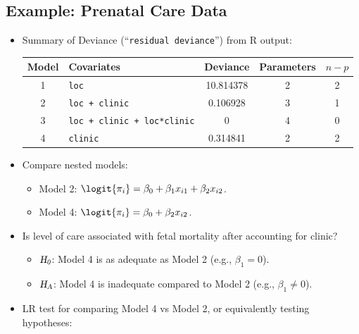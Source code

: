 \documentclass[oneside]{book}\usepackage[]{graphicx}\usepackage[svgnames]{xcolor}
\newcommand{\HN}{\textsl{H}_{\textsl{0}}}%
\newcommand{\HA}{\textsl{H}_{\textsl{A}}}%
\begin{document}
\subsection*{Example: Prenatal Care Data}
\begin{itemize}
      \item Summary of Deviance (``\texttt{residual deviance}'') from R output:
            \begin{table}[!htbp]
                  \centering
                  \begin{tabular}{clccc}
                        \toprule
                        Model & Covariates                         & Deviance  & Parameters & $ n-p $ \\
                        \midrule
                        1     & \texttt{loc}                       & 10.814378 & 2          & 2       \\
                        2     & \texttt{loc + clinic}              & 0.106928  & 3          & 1       \\
                        3     & \texttt{loc + clinic + loc*clinic} & 0         & 4          & 0       \\
                        4     & \texttt{clinic}                    & 0.314841  & 2          & 2       \\
                        \bottomrule
                  \end{tabular}
            \end{table}
      \item Compare nested models:
            \begin{itemize}
                  \item Model 2: $ \logit{\pi_i}=\beta_0+\beta_1x_{i1}+\beta_2x_{i2} $.
                  \item Model 4: $ \logit{\pi_i}=\beta_0+\beta_2x_{i2} $.
            \end{itemize}
      \item Is level of care associated with fetal mortality after accounting for clinic?
            \begin{itemize}
                  \item $ \HN $: Model 4 is as adequate as Model 2 (e.g., $ \beta_1=0 $).
                  \item $ \HA $: Model 4 is inadequate compared to Model 2 (e.g., $ \beta_1\ne 0 $).
            \end{itemize}
      \item LR test for comparing Model 4 vs Model 2, or equivalently testing hypotheses:

\end{itemize}
\end{document}
